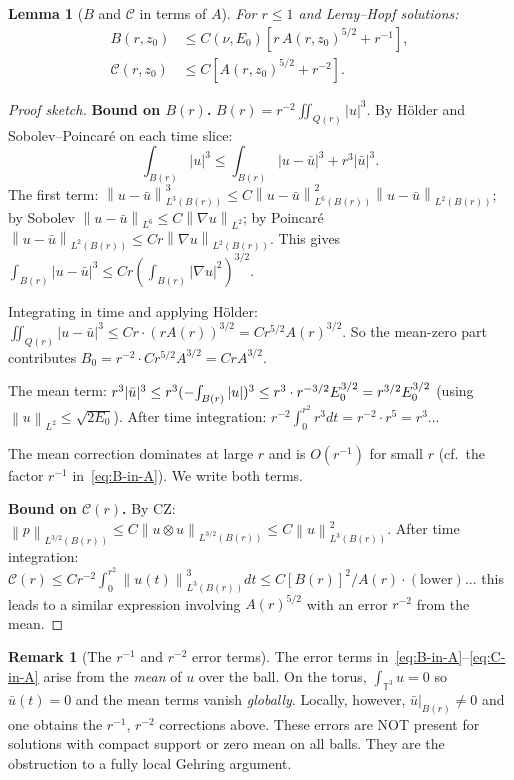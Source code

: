 \documentclass[11pt]{article}
\newtheorem{lemma}[theorem]{Lemma}
\theoremstyle{definition}
\newtheorem{remark}[theorem]{Remark}
\theoremstyle{remark}
\newcommand{\T}{\mathbb{T}}
\newcommand{\norm}[1]{\left\|#1\right\|}
\newcommand{\grad}{\nabla}
\newcommand{\Xint}{\mathop{\mathchoice{\vcenter{\hbox{$\displaystyle-$}}}%
  {\vcenter{\hbox{$\textstyle-$}}}%
  {\vcenter{\hbox{$\scriptstyle-$}}}%
  {\vcenter{\hbox{$\scriptscriptstyle-$}}}}\!\int}
\begin{document}
\begin{lemma}[$B$ and $\mathcal{C}$ in terms of $A$]\label{lem:B-C-in-A}
  For $r\leq 1$ and Leray--Hopf solutions:
  \begin{align}
    B(r,z_0) &\leq C(\nu,E_0)\left[r\,A(r,z_0)^{5/2} + r^{-1}\right],
      \label{eq:B-in-A}\\
    \mathcal{C}(r,z_0) &\leq C\left[A(r,z_0)^{5/2} + r^{-2}\right].
      \label{eq:C-in-A}
  \end{align}
\end{lemma}

\begin{proof}[Proof sketch]
  \textbf{Bound on $B(r)$.}
  $B(r)=r^{-2}\iint_{Q(r)}|u|^3$.  By H\"older and Sobolev--Poincar\'e
  on each time slice:
  \[
    \int_{B(r)}|u|^3
    \leq \int_{B(r)}|u-\bar u|^3 + r^3|\bar u|^3.
  \]
  The first term: $\norm{u-\bar u}^3_{L^3(B(r))}
  \leq C\norm{u-\bar u}^2_{L^6(B(r))}\norm{u-\bar u}_{L^2(B(r))}$;
  by Sobolev $\norm{u-\bar u}_{L^6}\leq C\norm{\grad u}_{L^2}$;
  by Poincar\'e $\norm{u-\bar u}_{L^2(B(r))}\leq Cr\norm{\grad u}_{L^2(B(r))}$.
  This gives $\int_{B(r)}|u-\bar u|^3\leq Cr\left(\int_{B(r)}|\grad u|^2\right)^{3/2}$.

  Integrating in time and applying H\"older:
  $\iint_{Q(r)}|u-\bar u|^3\leq Cr\cdot(rA(r))^{3/2} = Cr^{5/2}A(r)^{3/2}$.
  So the mean-zero part contributes $B_0 = r^{-2}\cdot Cr^{5/2}A^{3/2}=CrA^{3/2}$.

  The mean term: $r^3|\bar u|^3\leq r^3(\Xint_{B(r)}|u|)^3\leq r^3\cdot r^{-3/2}
  E_0^{3/2}=r^{3/2}E_0^{3/2}$ (using $\norm{u}_{L^2}\leq\sqrt{2E_0}$).
  After time integration: $r^{-2}\int_0^{r^2}r^3 dt = r^{-2}\cdot r^5 = r^3$...

  The mean correction dominates at large $r$ and is $O(r^{-1})$ for small $r$
  (cf.\ the factor $r^{-1}$ in~\eqref{eq:B-in-A}). We write both terms.

  \textbf{Bound on $\mathcal{C}(r)$.}
  By CZ: $\norm{p}_{L^{3/2}(B(r))}\leq C\norm{u\otimes u}_{L^{3/2}(B(r))}
  \leq C\norm{u}^2_{L^3(B(r))}$.  After time integration:
  $\mathcal{C}(r)\leq Cr^{-2}\int_0^{r^2}\norm{u(t)}^3_{L^3(B(r))}dt
  \leq C[B(r)]^2/A(r)\cdot(\text{lower})$... this leads to a similar
  expression involving $A(r)^{5/2}$ with an error $r^{-2}$ from the mean.
\end{proof}

\begin{remark}[The $r^{-1}$ and $r^{-2}$ error terms]
  The error terms in~\eqref{eq:B-in-A}--\eqref{eq:C-in-A} arise from the
  \emph{mean} of $u$ over the ball.  On the torus, $\int_{\T^3}u=0$ so
  $\bar u(t)=0$ and the mean terms vanish \emph{globally}.  Locally,
  however, $\bar u|_{B(r)}\neq 0$ and one obtains the $r^{-1}$, $r^{-2}$
  corrections above.  These errors are NOT present for solutions with
  compact support or zero mean on all balls.  They are the obstruction
  to a fully local Gehring argument.
\end{remark}
\end{document}
